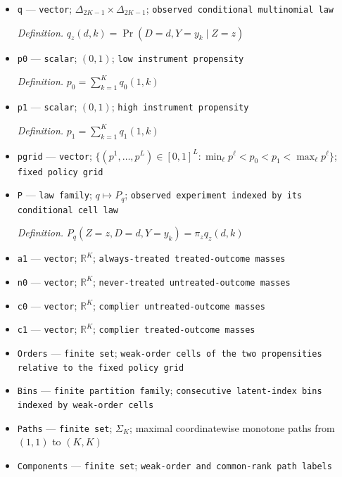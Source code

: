 \documentclass{article}
\begin{document}
\begin{itemize}
  \item \texttt{q} --- \texttt{vector}; \(\Delta_{2K-1}\times\Delta_{2K-1}\); \texttt{observed conditional multinomial law}
  \par\smallskip\noindent\emph{Definition.} \(q_z(d,k)=\Pr(D=d,Y=y_k\mid Z=z)\)
  \item \texttt{p0} --- \texttt{scalar}; \((0,1)\); \texttt{low instrument propensity}
  \par\smallskip\noindent\emph{Definition.} \(p_0=\sum_{k=1}^Kq_0(1,k)\)
  \item \texttt{p1} --- \texttt{scalar}; \((0,1)\); \texttt{high instrument propensity}
  \par\smallskip\noindent\emph{Definition.} \(p_1=\sum_{k=1}^Kq_1(1,k)\)
  \item \texttt{pgrid} --- \texttt{vector}; \(\{(p^1,\ldots,p^L)\in[0,1]^L:\min_\ell p^\ell<p_0<p_1<\max_\ell p^\ell\}\); \texttt{fixed policy grid}
  \item \texttt{P} --- \texttt{law family}; \(q\mapsto P_q\); \texttt{observed experiment indexed by its conditional cell law}
  \par\smallskip\noindent\emph{Definition.} \(P_q(Z=z,D=d,Y=y_k)=\pi_zq_z(d,k)\)
  \item \texttt{a1} --- \texttt{vector}; \(\mathbb R^K\); \texttt{always-\allowbreak{}treated treated-\allowbreak{}outcome masses}
  \item \texttt{n0} --- \texttt{vector}; \(\mathbb R^K\); \texttt{never-\allowbreak{}treated untreated-\allowbreak{}outcome masses}
  \item \texttt{c0} --- \texttt{vector}; \(\mathbb R^K\); \texttt{complier untreated-\allowbreak{}outcome masses}
  \item \texttt{c1} --- \texttt{vector}; \(\mathbb R^K\); \texttt{complier treated-\allowbreak{}outcome masses}
  \item \texttt{Orders} --- \texttt{finite set}; \texttt{weak-\allowbreak{}order cells of the two propensities relative to the fixed policy grid}
  \item \texttt{Bins} --- \texttt{finite partition family}; \texttt{consecutive latent-\allowbreak{}index bins indexed by weak-\allowbreak{}order cells}
  \item \texttt{Paths} --- \texttt{finite set}; \(\Sigma_K\); maximal coordinatewise monotone paths from \((1,1)\) to \((K,K)\)
  \item \texttt{Components} --- \texttt{finite set}; \texttt{weak-\allowbreak{}order and common-\allowbreak{}rank path labels}

\end{itemize}
\end{document}
